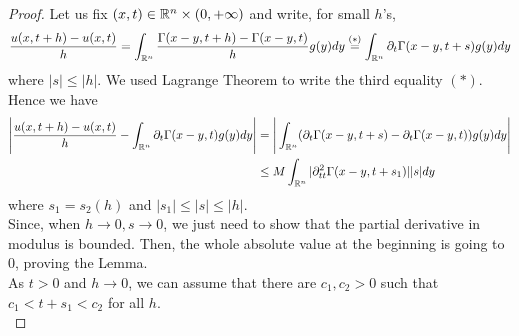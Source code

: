 \begin{ProofBox}
    \begin{proof}
        Let us fix $(x,t) \in \mathbb{R}^n \times (0,+\infty)$ and write, for small $h$'s,
        \begin{equation*}
            \frac{u(x,t+h) - u(x,t)}{h} = \int_{\mathbb{R}^n} \frac{\Gamma(x-y,t+h) - \Gamma(x-y,t)}{h} g(y) dy \stackrel{(*)}= \int_{\mathbb{R}^n} \partial_t \Gamma(x-y,t+s) g(y) dy
        \end{equation*}
        where $|s| \leq |h|$. We used Lagrange Theorem to write the third equality $(*)$. Hence we have
        \begin{align*}
            \Bigg|\frac{u(x,t+h) - u(x,t)}{h}-\int_{\mathbb{R}^n} \partial_t \Gamma(x-y,t) g(y)dy\Bigg|
            &= \Bigg|\int_{\mathbb{R}^n} (\partial_t \Gamma(x-y,t+s) - \partial_t \Gamma(x-y,t)) g(y) dy\Bigg|\\
            &\leq M \int_{\mathbb{R}^n} |\partial^2_{tt} \Gamma(x-y,t+s_1)| |s| dy
        \end{align*}
        where $s_1 = s_2(h)$ and $|s_1| \leq |s| \leq |h|$. \\
        Since, when $h \rightarrow 0, s \rightarrow 0$, we just need to show that the partial derivative in modulus is bounded. Then, the whole absolute value at the beginning is going to $0$, proving the Lemma.\\
        As $t > 0$ and $h \rightarrow 0$, we can assume that there are $c_1, c_2 > 0$ such that $c_1 < t+s_1 < c_2$ for all $h$. \\
        

\end{proof}
\end{ProofBox}
